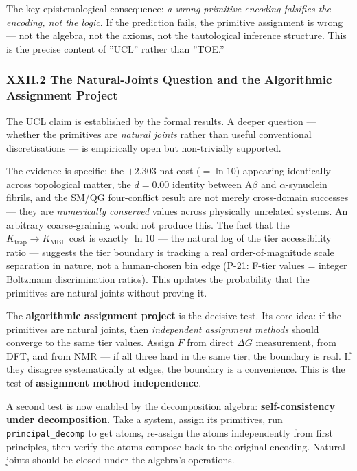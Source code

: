 \documentclass[12pt,a4paper]{article}
\begin{document}
The key epistemological consequence: \emph{a wrong primitive encoding falsifies the encoding, not the logic}. If the prediction fails, the primitive assignment is wrong --- not the algebra, not the axioms, not the tautological inference structure. This is the precise content of ''UCL'' rather than ''TOE.''

\subsubsection{XXII.2 The Natural-Joints Question and the Algorithmic Assignment Project}

The UCL claim is established by the formal results. A deeper question --- whether the primitives are \emph{natural joints} rather than useful conventional discretisations --- is empirically open but non-trivially supported.

The evidence is specific: the $+2.303$ nat cost ($= \ln 10$) appearing identically across topological matter, the $d = 0.00$ identity between A$\beta$ and $\alpha$-synuclein fibrils, and the SM/QG four-conflict result are not merely cross-domain successes --- they are \emph{numerically conserved} values across physically unrelated systems. An arbitrary coarse-graining would not produce this. The fact that the $K_\text{trap} \to K_\text{MBL}$ cost is exactly $\ln 10$ --- the natural log of the tier accessibility ratio --- suggests the tier boundary is tracking a real order-of-magnitude scale separation in nature, not a human-chosen bin edge (P-21: F-tier values = integer Boltzmann discrimination ratios). This updates the probability that the primitives are natural joints without proving it.

The \textbf{algorithmic assignment project} is the decisive test. Its core idea: if the primitives are natural joints, then \emph{independent assignment methods} should converge to the same tier values. Assign $F$ from direct $\Delta G$ measurement, from DFT, and from NMR --- if all three land in the same tier, the boundary is real. If they disagree systematically at edges, the boundary is a convenience. This is the test of \textbf{assignment method independence}.

A second test is now enabled by the decomposition algebra: \textbf{self-consistency under decomposition}. Take a system, assign its primitives, run \texttt{principal\_decomp} to get atoms, re-assign the atoms independently from first principles, then verify the atoms compose back to the original encoding. Natural joints should be closed under the algebra's operations.
\end{document}
